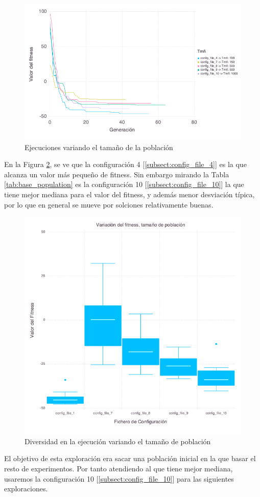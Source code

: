 \begin{figure}[]
	\centering	
	\includegraphics[scale=0.5]{../data/Plots/population_size_variation.png}
	\caption{ Ejecuciones variando el tamaño de la población }
    \label{fig:population_size_variation}
\end{figure}

En la Figura \ref{fig:population_size_box_plots}, se ve que la configuración 4 [\ref{subsect:config_file_4}] es la que alcanza un valor más pequeño de fitness.
Sin embargo mirando la Tabla \ref{tab:base_population} es la configuración 10 [\ref{subsect:config_file_10}] la que tiene mejor mediana para el valor del 
fitness, y además menor desviación típica, por lo que en general se mueve por solciones relativamente buenas.

\begin{figure}[]
	\centering	
	\includegraphics[scale=0.5]{../data/Plots/Rastrigin_box_plots_p_size.png}
	\caption{ Diversidad en la ejecución variando el tamaño de población }
    \label{fig:population_size_box_plots}
\end{figure}


El objetivo de esta exploración era sacar una población inicial en la que basar el resto de experimentos. Por tanto atendiendo al que tiene mejor mediana,
usaremos la configuración 10 [\ref{subsect:config_file_10}] para las siguientes exploraciones.